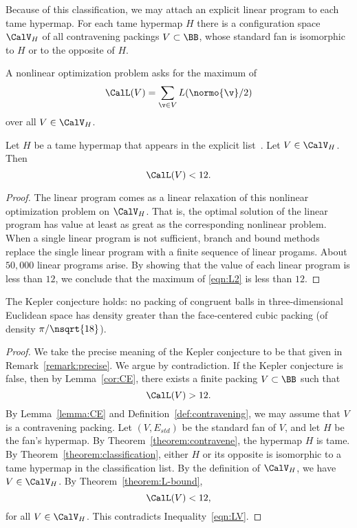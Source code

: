 Because of this classification, we may attach an explicit linear
program to each tame hypermap.  For each tame hypermap $H$ there is a
configuration space $\CalV_H$ of all contravening packings $V\subset
\BB$, whose standard fan is isomorphic to $H$ or to the
opposite of $H$.  
%
%

A nonlinear optimization problem asks for the maximum of
\begin{equation}\label{eqn:L2}
\CalL(V)=\sum_{\v\in V} L(\normo{\v}/2)
\end{equation}
over all $V\in \CalV_H$.

\begin{theorem}\label{theorem:L-bound}  
Let $H$ be a tame hypermap that appears in the
explicit list~\cite{website:FlyspeckProject}.  Let $V\in \CalV_H$.  Then
\[
\CalL(V) < 12.
\]
\end{theorem}
%

\begin{proof}
  The linear program comes as a linear relaxation of this nonlinear
  optimization problem on $\CalV_H$. That is, the optimal solution of
  the linear program has value at least as great as the corresponding
  nonlinear problem.  When a single linear program is not sufficient,
  branch and bound methods replace the single linear program with a
  finite sequence of linear progams.  About $50,000$ linear
  programs arise.  By showing that the value of each linear program is
  less than $12$, we conclude that the maximum of \eqref{eqn:L2} is less than
   $12$.
\end{proof}

\begin{theorem}  The Kepler conjecture holds: no packing of congruent
balls in three-dimensional Euclidean space
 has density greater than the face-centered cubic packing (of
density $\pi/\nsqrt{18}$).
\end{theorem}
%

\begin{proof} We take the precise meaning of the Kepler conjecture to
  be that given in Remark~\ref{remark:precise}.  We argue by
  contradiction.  If the Kepler conjecture is false, then by
  Lemma~\ref{cor:CE}, there exists a finite packing
  $V\subset\BB$ such that
\begin{equation}\label{eqn:LV}
\CalL(V) > 12.
\end{equation}
By Lemma~\ref{lemma:CE} and Definition~\ref{def:contravening}, we may
assume that $V$ is a contravening packing.  Let $(V,E_{std})$ be the
standard fan of $V$, and let $H$ be the fan's hypermap.  By
Theorem~\ref{theorem:contravene}, the hypermap $H$ is tame.  By
Theorem~\ref{theorem:classification}, either $H$ or its opposite is
isomorphic to a tame hypermap in the classification list.  By the
definition of $\CalV_H$, we have $V\in \CalV_H$.  By
Theorem~\ref{theorem:L-bound},
\begin{equation}\label{eqn:done-L12}
\CalL(V) < 12,
\end{equation}
for all $V\in \CalV_H$.
This contradicts Inequality~\ref{eqn:LV}.
\end{proof}